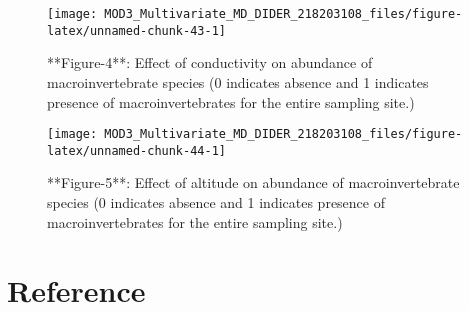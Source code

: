 \documentclass[
]{article}
\begin{document}
\begin{figure}

{\centering \texttt{[image: MOD3\_Multivariate\_MD\_DIDER\_218203108\_files/figure-latex/unnamed-chunk-43-1]} 

}

\caption{**Figure-4**: Effect of conductivity on abundance of macroinvertebrate species (0 indicates absence and 1 indicates presence of macroinvertebrates for the entire sampling site.)}\label{fig:unnamed-chunk-43}
\end{figure}
\begin{figure}

{\centering \texttt{[image: MOD3\_Multivariate\_MD\_DIDER\_218203108\_files/figure-latex/unnamed-chunk-44-1]} 

}

\caption{**Figure-5**: Effect of altitude on abundance of macroinvertebrate species (0 indicates absence and 1 indicates presence of macroinvertebrates for the entire sampling site.)}\label{fig:unnamed-chunk-44}
\end{figure}

\hypertarget{reference}{%
\section*{Reference}\label{reference}}
\end{document}
